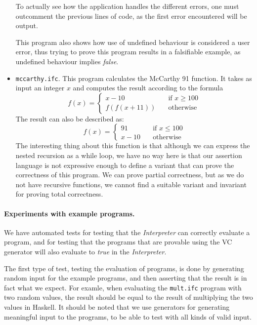 \begin{itemize}
	To actually see how the application handles the different errors, one must outcomment the previous lines of code, as the first error encountered will be output.

	This program also shows how use of undefined behaviour is considered a user error, thus trying to prove this program results in a falsifiable example, as undefined behaviour implies \textit{false}.

  \item{\texttt{mccarthy.ifc}.}
   This program calculates the McCarthy 91 function. It takes as input an integer $x$ and computes the result according to the formula
	\[ f(x) =
	  \begin{cases}
	    x - 10       & \quad \text{if } x \ge 100 \\
	    f(f(x + 11))  & \quad \text{otherwise}
	  \end{cases}
  \]
  The result can also be described as:
	\[ f(x) =
	  \begin{cases}
	    91       & \quad \text{if } x \leq 100 \\
	    x - 10   & \quad \text{otherwise}
	  \end{cases}
	\]
        The interesting thing about this function is that although we can express the nested recursion as a while loop, we have no way
        here is that our assertion language is not expressive enough to define a variant that can prove the correctness of this program.
	We can prove partial correctness, but as we do not have recursive functions, we cannot find a suitable variant and invariant for proving total correctness.
\end{itemize}

\paragraph{Experiments with example programs.}
We have automated tests for testing that the \textit{Interpreter} can correctly evaluate a program,
and for testing that the programs that are provable using the VC generator will also evaluate to \textit{true} in the \textit{Interpreter}.

The first type of test, testing the evaluation of programs, is done by generating random input for the example programs, and then asserting that the result is in fact what we expect.
For examle, when evaluating the \texttt{mult.ifc} program with two random values, the result should be equal to the result of multiplying the two values in Haskell.
It should be noted that we use generators for generating meaningful input to the programs, to be able to test with all kinds of valid input.

